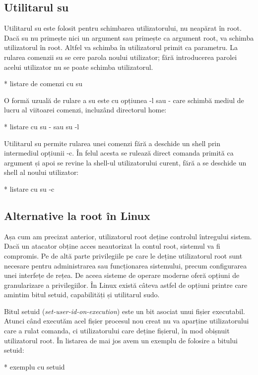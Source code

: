 \subsection{Utilitarul su}
\label{sec:users-superuser-su}

Utilitarul su este folosit pentru schimbarea utilizatorului, nu neapărat în
root. Dacă su nu primește nici un argument sau primește ca argument root, va
schimba utilizatorul în root. Altfel va schimba în utilizatorul primit ca
parametru. La rularea comenzii su se cere parola noului utilizator; fără
introducerea parolei acelui utilizator nu se poate schimba utilizatorul.

* listare de comenzi cu su

O formă uzuală de rulare a su este cu opțiunea -l sau - care schimbă mediul de
lucru al viitoarei comenzi, incluzând directorul home:

* listare cu su - sau su -l

Utilitarul su permite rularea unei comenzi fără a deschide un shell prin
intermediul opțiunii -c. În felul acesta se rulează direct comanda primită ca
argument și apoi se revine la shell-ul utilizatorului curent, fără a se deschide
un shell al noului utilizator:

* listare cu su -c

\subsection{Alternative la root în Linux}
\label{sec:users-superuser-altroot}

Așa cum am precizat anterior, utilizatorul root deține controlul întregului
sistem. Dacă un atacator obține acces neautorizat la contul root, sistemul va fi
compromis. Pe de altă parte privilegiile pe care le deține utilizatorul root
sunt necesare pentru administrarea sau funcționarea sistemului, precum
configurarea unei interfețe de rețea. De aceea sisteme de operare moderne oferă
opțiuni de granularizare a privilegiilor. În Linux există câteva astfel de
opțiuni printre care amintim bitul setuid, capabilități și utilitarul sudo.

Bitul setuid (\textit{set-user-id-on-execution}) este un bit asociat unui fișier
executabil. Atunci când executăm acel fișier procesul nou creat nu va aparține
utilizatorului care a rulat comanda, ci utilizatorului care deține fișierul, în
mod obișnuit utilizatorul root. În listarea de mai jos avem un exemplu de
folosire a bitului setuid:

* exemplu cu setuid

